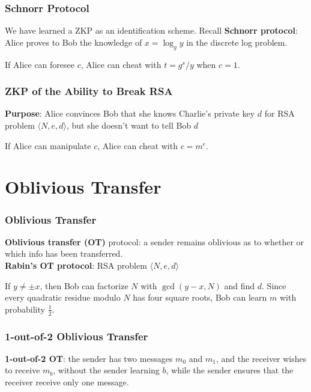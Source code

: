 \begin{frame}\frametitle{Schnorr Protocol}
We have learned a ZKP as an identification scheme. Recall \textbf{Schnorr protocol}: Alice proves to Bob the knowledge of $x=\log_gy$ in the discrete log problem.
\begin{figure}
\begin{center}

\end{center}
\end{figure}
If Alice can foresee $c$, Alice can cheat with $t=g^s/y$ when $c=1$.
\end{frame}
\begin{frame}\frametitle{ZKP of the Ability to Break RSA}
\textbf{Purpose}: Alice convinces Bob that she knows Charlie's private key $d$ for RSA problem $\langle N,e,d \rangle$, but she doesn't want to tell Bob $d$
\begin{figure}
\begin{center}

\end{center}
\end{figure}
If Alice can manipulate $c$, Alice can cheat with $c = m^e$.
\end{frame}
\section{Oblivious Transfer}
\begin{frame}\frametitle{Oblivious Transfer}
\textbf{Oblivious transfer (OT)} protocol: a sender remains oblivious as to whether or which info has been transferred.\\

\textbf{Rabin's OT protocol}: RSA problem $\langle N, e, d\rangle $
\begin{figure}
\begin{center}

\end{center}
\end{figure}
If $y \neq \pm x$, then Bob can factorize $N$ with $\gcd(y-x,N)$ and find $d$. Since every quadratic residue modulo $N$ has four square roots, Bob can learn $m$ with probability $\frac{1}{2}$.
\end{frame}
\begin{frame}\frametitle{1-out-of-2 Oblivious Transfer}
\textbf{1-out-of-2 OT}: the sender has two messages $m_0$ and $m_1$, and the receiver  wishes to receive $m_b$, without the sender learning $b$, while the sender ensures that the receiver receive only one message.
\begin{figure}
\begin{center}

\end{center}
\end{figure}
\end{frame}
